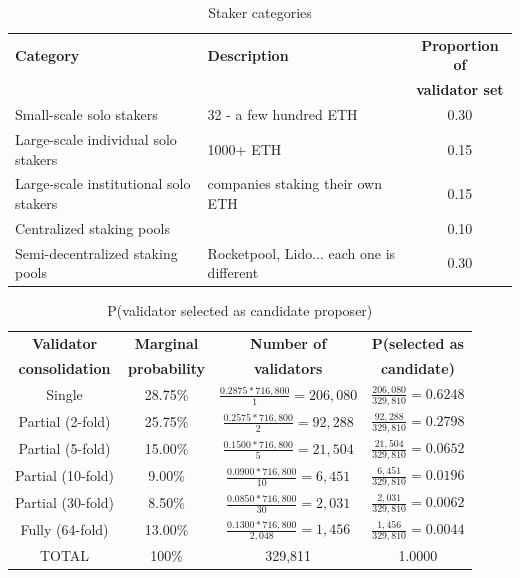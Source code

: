  \begin{table}[htp]
\caption{Staker categories}
\begin{center}
\begin{tabular}{|l|l|c|}
\hline
\textbf{Category} & \textbf{Description} & \textbf{Proportion of} \\
 & & \textbf{validator set} \\
 \hline
Small-scale solo stakers & 32 - a few hundred ETH & 0.30 \\
Large-scale individual solo stakers & 1000+ ETH & 0.15 \\
Large-scale institutional solo stakers & companies staking their own ETH & 0.15 \\
Centralized staking pools & & 0.10 \\
Semi-decentralized staking pools & Rocketpool, Lido... each one is different & 0.30 \\
\hline
\end{tabular}
\end{center}
\label{tbl:stakers}
\end{table}%


\begingroup
\renewcommand{\arraystretch}{1.5} %
\begin{table}[htp]
\caption{P(validator selected as candidate proposer)}
\label{tbl:candidate}
\begin{center}
\begin{tabular}{|c|c|c|c|}
\hline
\textbf{Validator} & \textbf{Marginal} & \textbf{Number of} & \textbf{P(selected as} \\
\textbf{consolidation} & \textbf{probability } & \textbf{validators} &\textbf{ candidate)}  \\
\hline
Single & 28.75\% & $\frac{0.2875 * 716,800}{1} = 206,080$ & $\frac{206,080}{329,810} = 0.6248$ \\
Partial (2-fold) & 25.75\% &  $\frac{0.2575 * 716,800}{2} = 92,288$ & $\frac{92,288}{329,810} = 0.2798$ \\
Partial (5-fold) & 15.00\% &  $\frac{0.1500 * 716,800}{5} =  21,504$ & $\frac{21,504}{329,810} =  0.0652$ \\
Partial (10-fold) & 9.00\% &  $\frac{0.0900 * 716,800}{10} = 6,451$ & $\frac{6,451}{329,810} = 0.0196$ \\
Partial (30-fold) & 8.50\% &  $\frac{0.0850 * 716,800}{30} = 2,031$ & $\frac{2,031}{329,810} = 0.0062$ \\
Fully (64-fold) & 13.00\% &  $\frac{0.1300 * 716,800}{2,048} = 1,456 $ & $\frac{1,456}{329,810} =  0.0044$\\
\hline
TOTAL & 100\% & 329,811 & 1.0000 \\
\hline

\end{tabular}
\end{center}
\end{table}%
\endgroup

